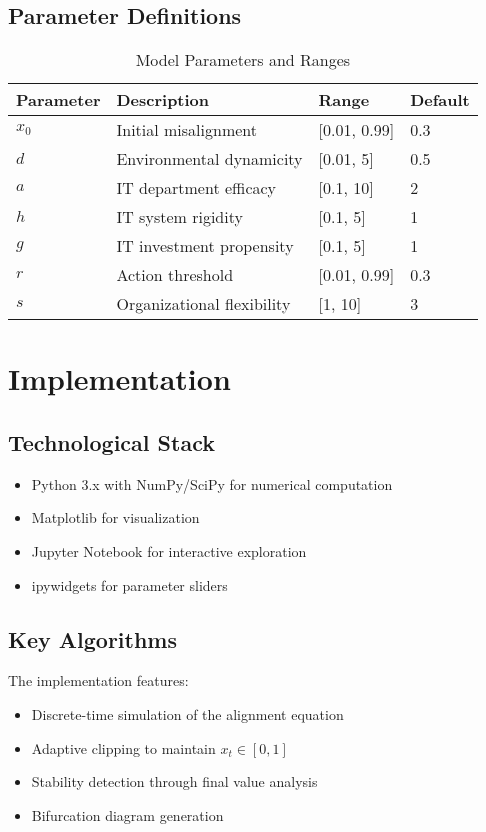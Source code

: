 \documentclass[a4paper, 12pt]{article}
\begin{document}
\subsection{Parameter Definitions}
\begin{table}[h]
	\centering
	\caption{Model Parameters and Ranges}
	\begin{tabular}{llll}
		\toprule
		\textbf{Parameter} & \textbf{Description}       & \textbf{Range} & \textbf{Default} \\
		\midrule
		$x_0$              & Initial misalignment       & [0.01, 0.99]   & 0.3              \\
		$d$                & Environmental dynamicity   & [0.01, 5]      & 0.5              \\
		$a$                & IT department efficacy     & [0.1, 10]      & 2                \\
		$h$                & IT system rigidity         & [0.1, 5]       & 1                \\
		$g$                & IT investment propensity   & [0.1, 5]       & 1                \\
		$r$                & Action threshold           & [0.01, 0.99]   & 0.3              \\
		$s$                & Organizational flexibility & [1, 10]        & 3                \\
		\bottomrule
	\end{tabular}
\end{table}

\section{Implementation}
\subsection{Technological Stack}
\begin{itemize}
	\item Python 3.x with NumPy/SciPy for numerical computation
	\item Matplotlib for visualization
	\item Jupyter Notebook for interactive exploration
	\item ipywidgets for parameter sliders
\end{itemize}

\subsection{Key Algorithms}
The implementation features:
\begin{itemize}
	\item Discrete-time simulation of the alignment equation
	\item Adaptive clipping to maintain $x_t \in [0,1]$
	\item Stability detection through final value analysis
	\item Bifurcation diagram generation
\end{itemize}
\end{document}
